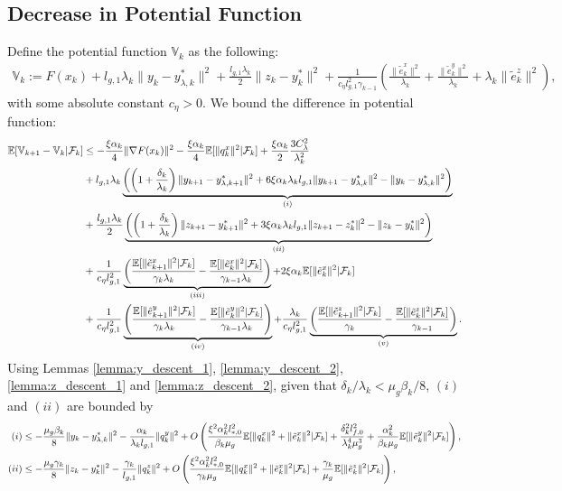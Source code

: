 \subsection{Decrease in Potential Function}
Define the potential function $\mathbb{V}_k$ as the following:
\begin{align*}
    \mathbb{V}_k := F(x_k) + l_{g,1} \lambda_k \|y_k - y_{\lambda, k}^*\|^2 + \frac{l_{g,1} \lambda_k }{2} \|z_k - y_k^*\|^2 + \frac{1}{c_\eta l_{g,1}^2 \gamma_{k-1}} \left(\frac{\|\tilde{e}_k^x\|^2}{\lambda_k} + \frac{\|\tilde{e}_k^y\|^2}{\lambda_k} + \lambda_k \|\tilde{e}_k^z\|^2 \right),
\end{align*}
with some absolute constant $c_\eta > 0$. We bound the difference in potential function:
\begin{align*}
    \mathbb{E}[ \mathbb{V}_{k+1} - \mathbb{V}_k | \mathcal{F}_k] &\le -\frac{\xi \alpha_k}{4} \|\nabla F(x_k)\|^2 - \frac{\xi \alpha_k}{4} \mathbb{E}[\|q_k^x\|^2 | \mathcal{F}_k] + \frac{\xi\alpha_k}{2} \frac{3 C_\lambda^2}{\lambda_k^2} \\
    &+ l_{g,1} \lambda_k \underbrace{\left( \left(1 + \frac{\delta_k}{\lambda_k} \right) \|y_{k+1} - y_{\lambda,k+1}^*\|^2 + 6 \xi\alpha_k\lambda_k l_{g,1} \|y_{k+1} - y_{\lambda,k}^*\|^2 - \|y_k - y_{\lambda,k}^*\|^2 \right)}_{(i)} \\
    &+ \frac{l_{g,1} \lambda_k}{2} \underbrace{\left( \left(1 + \frac{\delta_k}{\lambda_k} \right) \|z_{k+1} - y_{k+1}^*\|^2 + 3 \xi\alpha_k\lambda_k l_{g,1} \|z_{k+1} - z_{k}^*\|^2 - \|z_k - y_{k}^*\|^2 \right)}_{(ii)} \\
    &+ \frac{1}{c_\eta l_{g,1}^2 } \underbrace{\left( \frac{\mathbb{E}[\|\tilde{e}_{k+1}^x\|^2 | \mathcal{F}_k]}{\gamma_k \lambda_k} - \frac{\mathbb{E}[ \|\tilde{e}_{k}^x\|^2 | \mathcal{F}_k]}{\gamma_{k-1} \lambda_k} \right)}_{(iii)} + 2 \xi \alpha_k \mathbb{E}[\|\tilde{e}_k^x\|^2 | \mathcal{F}_k]  \\
    &+ \frac{1}{c_\eta l_{g,1}^2} \underbrace{\left( \frac{\mathbb{E}[\|\tilde{e}_{k+1}^y\|^2 | \mathcal{F}_k]}{\gamma_k \lambda_k} - \frac{\mathbb{E}[ \|\tilde{e}_{k}^y\|^2 | \mathcal{F}_k]}{\gamma_{k-1} \lambda_k} \right)}_{(iv)} + \frac{\lambda_k}{c_\eta l_{g,1}^2} \underbrace{\left( \frac{\mathbb{E}[\|\tilde{e}_{k+1}^z\|^2 | \mathcal{F}_k]}{\gamma_k} - \frac{\mathbb{E}[ \|\tilde{e}_{k}^z\|^2 | \mathcal{F}_k]}{\gamma_{k-1}} \right)}_{(v)}. 
\end{align*}
Using Lemmas \ref{lemma:y_descent_1}, \ref{lemma:y_descent_2}, \ref{lemma:z_descent_1} and \ref{lemma:z_descent_2}, given that $\delta_k/\lambda_k < \mu_g \beta_k / 8$, $(i)$ and $(ii)$ are bounded by
\begin{align*}
    (i) &\le -\frac{\mu_g \beta_k}{ 8 }\|y_{k} - y_{\lambda,k}^*\|^2 - \frac{\alpha_k}{\lambda_k l_{g,1}} \|q_k^y\|^2 + O\left( \frac{\xi^2 \alpha_k^2 l_{*,0}^2 }{\beta_k \mu_g} \mathbb{E}[\|q_k^x\|^2 + \|\tilde{e}_k^x\|^2 | \mathcal{F}_k] + \frac{\delta_k^2 l_{f,0}^2 }{\lambda_k^4 \mu_g^3 } + \frac{\alpha_k^2}{\beta_k \mu_g} \mathbb{E}[\|\tilde{e}_k^y\|^2 | \mathcal{F}_k] \right), \\
    (ii) &\le -\frac{\mu_g \gamma_k}{ 8} \|z_{k} - y_k^*\|^2 - \frac{\gamma_k}{l_{g,1}} \|q_k^z\|^2 + O\left( \frac{\xi^2 \alpha_k^2 l_{*,0}^2 }{\gamma_k \mu_g} \mathbb{E}[\|q_k^x\|^2 + \|\tilde{e}_k^x\|^2 | \mathcal{F}_k] + \frac{\gamma_k}{\mu_g} \mathbb{E}[\|\tilde{e}_k^z\|^2 | \mathcal{F}_k] \right), 
\end{align*}
